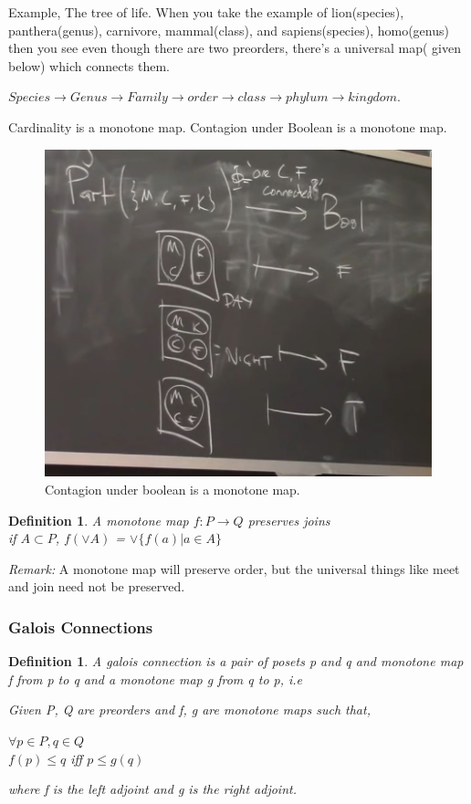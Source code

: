 \documentclass{article}
\newtheorem{defn}[thm]{Definition} %
\begin{document}
Example, The tree of life. 
When you take the example of lion(species), panthera(genus), carnivore, mammal(class), and sapiens(species), homo(genus) then you see even though there are two preorders, there's a universal map( given below) which connects them. 

$Species \rightarrow Genus \rightarrow Family \rightarrow order \rightarrow class \rightarrow phylum \rightarrow kingdom$.

Cardinality is a monotone map. Contagion under Boolean is a monotone map. 
\begin{figure}[h!]
    \centering
    \includegraphics[scale=0.5]{./images/3.jpg} 
    \caption{Contagion under boolean is a monotone map.}
    \label{fig:my_label} 
\end{figure}

\begin{defn}
A monotone map $ f: P \rightarrow Q $ preserves joins \\
if $A \subset P$, $f(\vee A)$ = $\vee \{ f(a)| a\in A \} $
\end{defn}

\emph{Remark:} A monotone map will preserve order, but the universal things like meet and join need not be preserved.
\newpage
\subsubsection{Galois Connections}
\begin{defn}
A galois connection is a pair of posets p and q and monotone map f from p to q and a monotone map g from q to p, i.e

Given P, Q are preorders and f, g are monotone maps such that, 

$ \forall p \in P, q \in Q $ \\
$ f(p) \leq q$ iff $p \leq g(q) $

where f is the left adjoint and g is the right adjoint. 
\end{defn}
\end{document}
